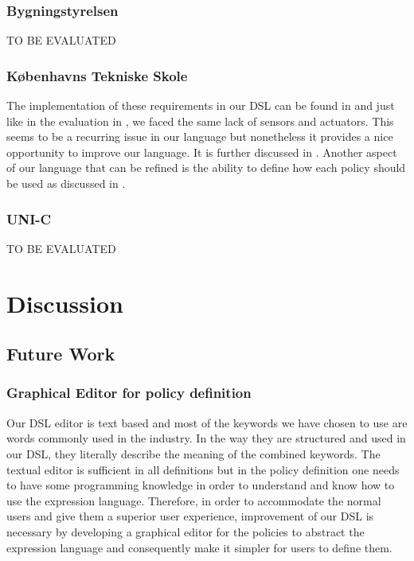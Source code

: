 \documentclass{llncs}
\begin{document}
\subsubsection{Bygningstyrelsen}\label{subsec:bygstyrelsen}
TO BE EVALUATED

\subsubsection{K\o benhavns Tekniske Skole}\label{subsec:kts}
The implementation of these requirements in our DSL can be found in  and just like in the evaluation in , we faced the same lack of sensors and actuators. This seems to be a recurring issue in our language but nonetheless it provides a nice opportunity to improve our language. It is further discussed in . 
Another aspect of our language that can be refined is the ability to define how each policy should be used as discussed in . 
 
\subsubsection{UNI-C}\label{subsec:uni-c}
TO BE EVALUATED

\section{Discussion}\label{sec:discussion}
\subsection{Future Work}\label{subsec:futurework}

\subsubsection{Graphical Editor for policy definition}\label{subsec:graphicaleditor}
Our DSL editor is text based and most of the keywords we have chosen to use are words commonly used in the industry. In the way they are structured and used in our DSL, they literally describe the meaning of the combined keywords. The textual editor is sufficient in all definitions but in the policy definition one needs to have some programming knowledge in order to understand and know how to use the expression language. Therefore, in order to accommodate the normal users and give them a superior user experience, improvement of our DSL is necessary by developing a graphical editor for the policies to abstract the expression language and consequently make it simpler for users to define them.
\end{document}
